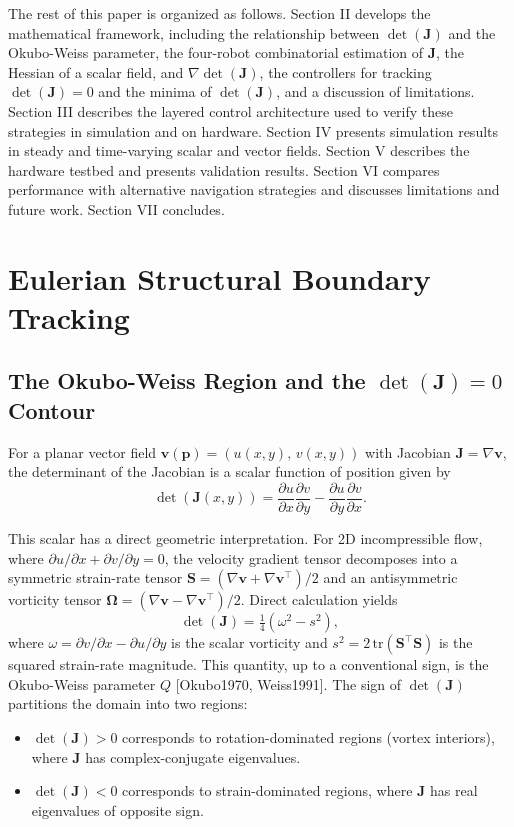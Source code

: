 \documentclass[lettersize,journal]{IEEEtran}
\begin{document}
The rest of this paper is organized as follows. Section II develops the mathematical framework, including the relationship between $\det(\mathbf{J})$ and the Okubo-Weiss parameter, the four-robot combinatorial estimation of $\mathbf{J}$, the Hessian of a scalar field, and $\nabla \det(\mathbf{J})$, the controllers for tracking $\det(\mathbf{J}) = 0$ and the minima of $\det(\mathbf{J})$, and a discussion of limitations. Section III describes the layered control architecture used to verify these strategies in simulation and on hardware. Section IV presents simulation results in steady and time-varying scalar and vector fields. Section V describes the hardware testbed and presents validation results. Section VI compares performance with alternative navigation strategies and discusses limitations and future work. Section VII concludes.


\section{Eulerian Structural Boundary Tracking}

\subsection{The Okubo-Weiss Region and the $\det(\mathbf{J}) = 0$ Contour}

For a planar vector field $\mathbf{v}(\mathbf{p}) = (u(x,y),\, v(x,y))$ with Jacobian $\mathbf{J} = \nabla\mathbf{v}$, the determinant of the Jacobian is a scalar function of position given by
\begin{equation}
\det(\mathbf{J}(x,y)) = \frac{\partial u}{\partial x}\frac{\partial v}{\partial y} - \frac{\partial u}{\partial y}\frac{\partial v}{\partial x}.
\end{equation}

This scalar has a direct geometric interpretation. For 2D incompressible flow, where $\partial u / \partial x + \partial v / \partial y = 0$, the velocity gradient tensor decomposes into a symmetric strain-rate tensor $\mathbf{S} = (\nabla\mathbf{v} + \nabla\mathbf{v}^\top)/2$ and an antisymmetric vorticity tensor $\boldsymbol{\Omega} = (\nabla\mathbf{v} - \nabla\mathbf{v}^\top)/2$. Direct calculation yields
\begin{equation}
\det(\mathbf{J}) = \tfrac{1}{4}\left(\omega^2 - s^2\right),
\end{equation}
where $\omega = \partial v/\partial x - \partial u/\partial y$ is the scalar vorticity and $s^2 = 2\,\mathrm{tr}(\mathbf{S}^\top \mathbf{S})$ is the squared strain-rate magnitude. This quantity, up to a conventional sign, is the Okubo-Weiss parameter $Q$ [Okubo1970, Weiss1991]. The sign of $\det(\mathbf{J})$ partitions the domain into two regions:
\begin{itemize}
\item $\det(\mathbf{J}) > 0$ corresponds to rotation-dominated regions (vortex interiors), where $\mathbf{J}$ has complex-conjugate eigenvalues.
\item $\det(\mathbf{J}) < 0$ corresponds to strain-dominated regions, where $\mathbf{J}$ has real eigenvalues of opposite sign.
\end{itemize}
\end{document}
